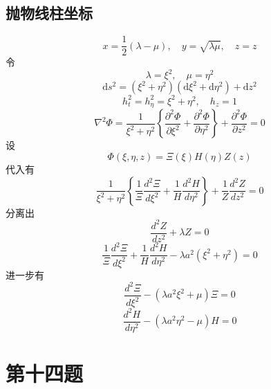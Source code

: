 \documentclass[a4paper]{ctexart}
\begin{document}
\subsection{抛物线柱坐标}
\[
    x=\frac{1}{2}(\lambda-\mu), \quad y=\sqrt{\lambda \mu}, \quad z=z
\]
令
\[
    \lambda=\xi^{2}, \quad \mu=\eta^{2}
\]
\[
    \mathrm{d} s^{2}=\left(\xi^{2}+\eta^{2}\right)\left(\mathrm{d} \xi^{2}+\mathrm{d} \eta^{2}\right)+\mathrm{d} z^{2}
\]
\[
    h_{t}^{2}=h_{\eta}^{2} =\xi^{2}+\eta^{2}, \quad h_{z}=1
\]
\[
    \nabla^{2} \Phi=\frac{1}{\xi^{2}+\eta^{2}}\left\{\frac{\partial^{2} \Phi}{\partial \xi^{2}}+\frac{\partial^{2} \Phi}{\partial \eta^{2}}\right\}+\frac{\partial^{2} \Phi}{\partial z^{2}}=0
\]
设
$$
    \Phi \left( \xi ,\eta ,z \right) =\varXi \left( \xi \right) H\left( \eta \right) Z\left( z \right)
$$
代入有
$$
    \frac{1}{\xi ^2+\eta ^2}\left\{ \frac{1}{\varXi}\frac{d^2\varXi}{d\xi ^2}+\frac{1}{H}\frac{d^2H}{d\eta ^2} \right\} +\frac{1}{Z}\frac{d^2Z}{dz^2}=0
$$
分离出
\begin{equation}
    \frac{d^2Z}{dz^2}+\lambda Z=0
\end{equation}
$$
    \frac{1}{\varXi}\frac{d^2\varXi}{d\xi ^2}+\frac{1}{H}\frac{d^2H}{d\eta ^2}-\lambda a^2\left( \xi ^2+\eta ^2 \right) =0
$$
进一步有
\begin{equation}
    \frac{d^2\varXi}{d\xi ^2}-\left( \lambda a^2\xi ^2+\mu \right) \varXi =0
\end{equation}
\begin{equation}
    \frac{d^2H}{d\eta ^2}-\left( \lambda a^2\eta ^2-\mu \right) H=0
\end{equation}
\section{第十四题}
\end{document}

